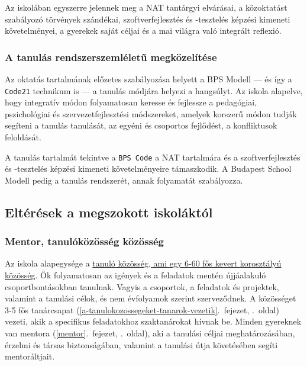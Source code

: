 Az iskolában egyszerre jelennek meg a NAT tantárgyi elvárásai, a
közoktatást szabályozó törvények szándékai, szoftverfejlesztés és
-tesztelés képzési kimeneti követelményei, a gyerekek saját céljai és a
mai világra való integrált reflexió.

\hypertarget{a-tanulas-rendszerszemleletu-megkozelitese}{%
\subsubsection{A tanulás rendszerszemléletű
megközelítése}\label{a-tanulas-rendszerszemleletu-megkozelitese}}

Az oktatás tartalmának előzetes szabályozása helyett a BPS Modell --- és
így a \texttt{Code21} technikum is --- a tanulás módjára helyezi a
hangsúlyt. Az iskola alapelve, hogy integratív módon folyamatosan
keresse és fejlessze a pedagógiai, pszichológiai és szervezetfejlesztési
módszereket, amelyek korszerű módon tudják segíteni a tanulás tanulását,
az egyéni és csoportos fejlődést, a konfliktusok feloldását.

A tanulás tartalmát tekintve a \texttt{BPS\ Code} a NAT tartalmára és a
szoftverfejlesztés és -tesztelés képzési kimeneti követelményeire
támaszkodik. A Budapest School Modell pedig a tanulás rendszerét, annak
folyamatát szabályozza.

\hypertarget{elteresek-a-megszokott-iskolaktol}{%
\subsection{Eltérések a megszokott
iskoláktól}\label{elteresek-a-megszokott-iskolaktol}}

\hypertarget{mentor-tanulokozosseg-kozosseg}{%
\subsubsection{Mentor, tanulóközösség
közösség}\label{mentor-tanulokozosseg-kozosseg}}

Az iskola alapegysége a
\href{/tanulasi-elmeny/tanulo-kozosseg.md}{tanuló közösség, ami egy 6-60
fős kevert korosztályú közösség}. Ők folyamatosan az igények és a
feladatok mentén újjáalakuló csoportbontásokban tanulnak. Vagyis a
csoportok, a feladatok és projektek, valamint a tanulási célok, és nem
évfolyamok szerint szerveződnek. A közösséget
3-5 fős tanárcsapat (\ref{a-tanulokozossegeket-tanarok-vezetik}.~fejezet, \pageref{a-tanulokozossegeket-tanarok-vezetik}.~oldal)
vezeti, akik a specifikus feladatokhoz szaktanárokat hívnak be. Minden
gyereknek van
mentora (\ref{mentor}.~fejezet, \pageref{mentor}.~oldal), aki a
tanulási céljai meghatározásában, érzelmi és társas biztonságában,
valamint a tanulási útja követésében segíti mentoráltjait.

